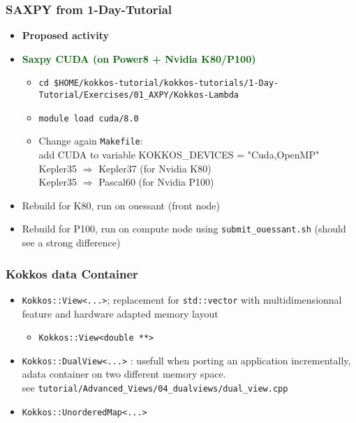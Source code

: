 \begin{frame}[fragile=singleslide]
  \frametitle{SAXPY from 1-Day-Tutorial}

  \begin{itemize}
  \item \textbf{Proposed activity}
  \item \textcolor{darkgreen}{\textbf{Saxpy CUDA (on Power8 + Nvidia K80/P100)}}
    \begin{itemize}
    \item \texttt{cd \$HOME/kokkos-tutorial/kokkos-tutorials/1-Day-Tutorial/Exercises/01\_AXPY/Kokkos-Lambda}
    \item \texttt{module load cuda/8.0}
    \item Change again \texttt{Makefile}: \\
      add CUDA to variable KOKKOS\_DEVICES = "Cuda,OpenMP"\\
      Kepler35 $\Rightarrow$ Kepler37 (for Nvidia K80)\\
      Kepler35 $\Rightarrow$ Pascal60 (for Nvidia P100)
    \end{itemize}
  \item Rebuild for K80, run on ouessant (front node)
  \item Rebuild for P100, run on compute node using \texttt{submit\_ouessant.sh} (should see a strong difference)
  \end{itemize}

\end{frame}


\begin{frame}[fragile=singleslide]
  \frametitle{Kokkos data Container}

  \begin{itemize}
  \item \texttt{Kokkos::View<...>}; replacement for \texttt{std::vector} with multidimensionnal feature and hardware adapted memory layout\\
    \begin{itemize}
    \item \texttt{Kokkos::View<double **>}
    \end{itemize}

  \item \texttt{Kokkos::DualView<...>} : usefull when porting an application incrementally, adata container on two different memory space.\\
    see \texttt{tutorial/Advanced\_Views/04\_dualviews/dual\_view.cpp}
  \item \texttt{Kokkos::UnorderedMap<...>}
  \end{itemize}

\end{frame}

